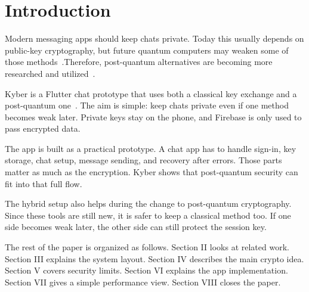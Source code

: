 \section{Introduction}

Modern messaging apps should keep chats private. Today this usually depends on public-key cryptography, but future quantum computers may weaken some of those methods~\cite{shor,grover}.Therefore, post-quantum alternatives are becoming more researched and utilized~\cite{fips203,bsi_hybrid}.

Kyber is a Flutter chat prototype that uses both a classical key exchange and a post-quantum one~\cite{rfc7748,fips203,pqxdh}. The aim is simple: keep chats private even if one method becomes weak later. Private keys stay on the phone, and Firebase is only used to pass encrypted data.

The app is built as a practical prototype. A chat app has to handle sign-in, key storage, chat setup, message sending, and recovery after errors. Those parts matter as much as the encryption. Kyber shows that post-quantum security can fit into that full flow.

The hybrid setup also helps during the change to post-quantum cryptography. Since these tools are still new, it is safer to keep a classical method too. If one side becomes weak later, the other side can still protect the session key.

The rest of the paper is organized as follows. Section II looks at related work. Section III explains the system layout. Section IV describes the main crypto idea. Section V covers security limits. Section VI explains the app implementation. Section VII gives a simple performance view. Section VIII closes the paper.
